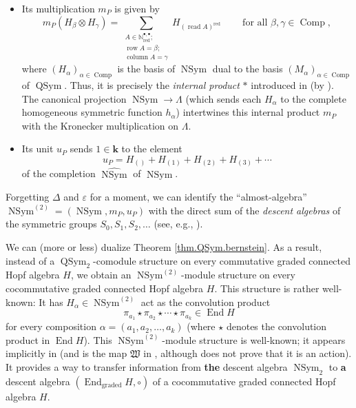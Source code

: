 \documentclass[numbers=enddot,12pt,final,onecolumn,notitlepage,abstracton]{scrartcl}%
\theoremstyle{definition}
\let\sumnonlimits\sum
\renewcommand{\sum}{\sumnonlimits\limits}
\begin{document}
\begin{itemize}
\item Its multiplication $m_{P}$ is given by%
\[
m_{P}\left(  H_{\beta}\otimes H_{\gamma}\right)  =\sum_{\substack{A\in
\mathbb{N}_{\operatorname*{red}}^{\bullet,\bullet};\\\operatorname*{row}%
A=\beta;\\\operatorname*{column}A=\gamma}}H_{\left(  \operatorname*{read}%
A\right)  ^{\operatorname*{red}}}\ \ \ \ \ \ \ \ \ \ \text{for all }%
\beta,\gamma\in\operatorname*{Comp},
\]
where $\left(  H_{\alpha}\right)  _{\alpha\in\operatorname*{Comp}}$ is the
basis of $\operatorname*{NSym}$ dual to the basis $\left(  M_{\alpha}\right)
_{\alpha\in\operatorname*{Comp}}$ of $\operatorname*{QSym}$. Thus, it is
precisely the \emph{internal product} $\ast$ introduced in \cite[Section
5.1]{NCSF1} (by \cite[Proposition 5.1]{NCSF1}). The canonical projection
$\operatorname*{NSym}\rightarrow\Lambda$ (which sends each $H_{\alpha}$ to the
complete homogeneous symmetric function $h_{\alpha}$) intertwines this
internal product $m_{P}$ with the Kronecker multiplication on $\Lambda$.

\item Its unit $u_{P}$ sends $1\in\mathbf{k}$ to the element%
\[
u_{P}=H_{\left(  {}\right)  }+H_{\left(  1\right)  }+H_{\left(  2\right)
}+H_{\left(  3\right)  }+\cdots
\]
of the completion $\widehat{\operatorname*{NSym}}$ of $\operatorname*{NSym}$.
\end{itemize}

Forgetting $\Delta$ and $\varepsilon$ for a moment, we can identify the
\textquotedblleft almost-algebra\textquotedblright\ $\operatorname*{NSym}%
\nolimits^{\left(  2\right)  }=\left(  \operatorname*{NSym},m_{P}%
,u_{P}\right)  $ with the direct sum of the \emph{descent algebras} of the
symmetric groups $S_{0},S_{1},S_{2},\ldots$ (see, e.g., \cite[Section
5.1]{NCSF1}).

We can (more or less) dualize Theorem \ref{thm.QSym.bernstein}. As a result,
instead of a $\operatorname*{QSym}\nolimits_{2}$-comodule structure on every
commutative graded connected Hopf algebra $H$, we obtain an
$\operatorname*{NSym}\nolimits^{\left(  2\right)  }$-module structure on every
cocommutative graded connected Hopf algebra $H$. This structure is rather
well-known: It has $H_{\alpha}\in\operatorname*{NSym}\nolimits^{\left(
2\right)  }$ act as the convolution product
\[
\pi_{a_{1}}\star\pi_{a_{2}}\star\cdots\star\pi_{a_{k}}\in\operatorname*{End}H
\]
for every composition $\alpha=\left(  a_{1},a_{2},\ldots,a_{k}\right)  $
(where $\star$ denotes the convolution product in $\operatorname*{End}H$).
This $\operatorname*{NSym}\nolimits^{\left(  2\right)  }$-module structure is
well-known; it appears implicitly in \cite[Th\'{e}or\`{e}me II.7]{Patras94}
(and is the map $\mathfrak{W}$ in \cite[Hint to Exercise 5.4.6]{Reiner},
although \cite{Reiner} does not prove that it is an action). It provides a way
to transfer information from \textbf{the} descent algebra
$\operatorname*{NSym}\nolimits_{2}$ to \textbf{a} descent algebra $\left(
\operatorname*{End}\nolimits_{\text{graded}}H,\circ\right)  $ of a
cocommutative graded connected Hopf algebra $H$.
\end{document}
